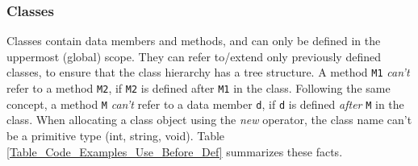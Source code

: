 \documentclass{article}
\begin{document}
\subsubsection{Classes}
\label{subsubsection_Classes}
Classes contain data members and methods,
and can only be defined in the uppermost (global) scope.
They can refer to/extend only previously defined classes,
to ensure that the class hierarchy has a tree structure.
A method \verb"M1" \textit{can't} refer to a method \verb"M2",
if \verb"M2" is defined after \verb"M1" in the class.
Following the same concept, %
a method \verb"M" \textit{can't} refer to a data member \verb"d",
if \verb"d" is defined \textit{after} \verb"M" in the class.
When allocating a class object using the \textit{new} operator,
the class name can't be a primitive type (int, string, void).
Table \ref{Table_Code_Examples_Use_Before_Def} summarizes these facts.
\end{document}
